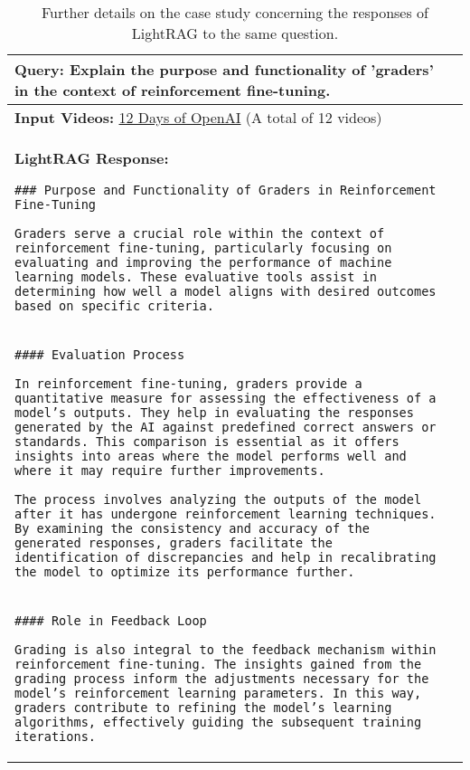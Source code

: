 \begin{table*}[t]
\centering
\caption{Further details on the case study concerning the responses of LightRAG to the same question.}
\label{tab:case study}
\small
\begin{tabularx}{\textwidth}{X X}

\toprule
\textbf{Query:} Explain the purpose and functionality of 'graders' in the context of reinforcement fine-tuning.\\

\midrule
\textbf{Input Videos:} \href{https://www.youtube.com/playlist?list=PLOXw6I10VTv9lin5AzsHAHCTrC7BdVdEM}{12 Days of OpenAI} (A total of 12 videos) \\

\midrule

\textbf{LightRAG Response:} 

\texttt{\#\#\# Purpose and Functionality of Graders in Reinforcement Fine-Tuning}

\texttt{Graders serve a crucial role within the context of reinforcement fine-tuning, particularly focusing on evaluating and improving the performance of machine learning models. These evaluative tools assist in determining how well a model aligns with desired outcomes based on specific criteria.}

\\

\texttt{\#\#\#\# Evaluation Process}

\texttt{In reinforcement fine-tuning, graders provide a quantitative measure for assessing the effectiveness of a model's outputs. They help in evaluating the responses generated by the AI against predefined correct answers or standards. This comparison is essential as it offers insights into areas where the model performs well and where it may require further improvements.}

\texttt{The process involves analyzing the outputs of the model after it has undergone reinforcement learning techniques. By examining the consistency and accuracy of the generated responses, graders facilitate the identification of discrepancies and help in recalibrating the model to optimize its performance further. } 

\\

\texttt{\#\#\#\# Role in Feedback Loop}

\texttt{Grading is also integral to the feedback mechanism within reinforcement fine-tuning. The insights gained from the grading process inform the adjustments necessary for the model's reinforcement learning parameters. In this way, graders contribute to refining the model’s learning algorithms, effectively guiding the subsequent training iterations.}


\end{tabularx}
\end{table*}
